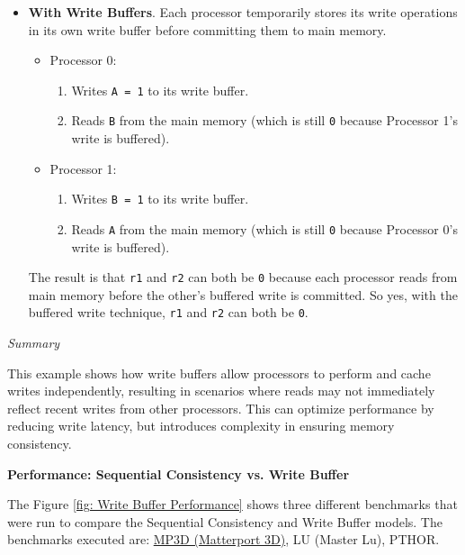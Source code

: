 \begin{examplebox}
\begin{itemize}
        \item \textbf{With Write Buffers}. Each processor temporarily stores its write operations in its own write buffer before committing them to main memory.
        \begin{itemize}
            \item Processor 0:
            \begin{enumerate}
                \item Writes \texttt{A = 1} to its write buffer.
                \item Reads \texttt{B} from the main memory (which is still \texttt{0} because Processor 1's write is buffered).
            \end{enumerate}

            \item Processor 1:
            \begin{enumerate}
                \item Writes \texttt{B = 1} to its write buffer.
                \item Reads \texttt{A} from the main memory (which is still \texttt{0} because Processor 0's write is buffered).
            \end{enumerate}
        \end{itemize}
        The result is that \texttt{r1} and \texttt{r2} can both be \texttt{0} because each processor reads from main memory before the other's buffered write is committed. So yes, with the buffered write technique, \texttt{r1} and \texttt{r2} can both be \texttt{0}.
    \end{itemize}

    \highspace
    \begin{flushleft}
        \emph{Summary}
    \end{flushleft}
    This example shows how write buffers allow processors to perform and cache writes independently, resulting in scenarios where reads may not immediately reflect recent writes from other processors. This can optimize performance by reducing write latency, but introduces complexity in ensuring memory consistency.
\end{examplebox}

\newpage

\begin{flushleft}
    \textcolor{Green3}{ \textbf{Performance: Sequential Consistency vs. Write Buffer}}
\end{flushleft}
The Figure \ref{fig: Write Buffer Performance} shows three different benchmarks that were run to compare the Sequential Consistency and Write Buffer models. The benchmarks executed are: \href{https://aihabitat.org/datasets/hm3d/}{MP3D (Matterport 3D)}, LU (Master Lu), PTHOR.

